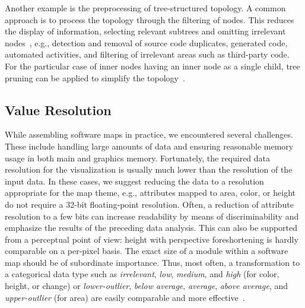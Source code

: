 \documentclass{svjour3}                     %
\begin{document}
Another example is the preprocessing of tree-structured topology.
A common approach is to process the topology through the filtering of nodes.
This reduces the display of information, selecting relevant subtrees and omitting irrelevant nodes~\citep{veras2017-minimumdescription,limberger2017-aggregation}, e.g., detection and removal of source code duplicates, generated code, automated activities, and filtering of irrelevant areas such as third-party code.
For the particular case of inner nodes having an inner node as a single child, tree pruning can be applied to simplify the topology~\citep{bladh2004-threedimensions}.

\subsection{Value Resolution}
While assembling software maps in practice, we encountered several challenges.
These include handling large amounts of data and ensuring reasonable memory usage in both main and graphics memory.
Fortunately, the required data resolution for the visualization is usually much lower than the resolution of the input data.
In these cases, we suggest reducing the data to a resolution appropriate for the map theme, e.g., attributes mapped to area, color, or height do not require a 32-bit floating-point resolution.
Often, a reduction of attribute resolution to a few bits can increase readability by means of discriminability and emphasize the results of the preceding data analysis.
This can also be supported from a perceptual point of view: height with perspective foreshortening is hardly comparable on a per-pixel basis.
The exact size of a module within a software map should be of subordinate importance.
Thus, most often, a transformation to a categorical data type such as \emph{irrelevant}, \emph{low}, \emph{medium}, and \emph{high} (for color, height, or change) or \emph{lower-outlier}, \emph{below average}, \emph{average}, \emph{above average}, and \emph{upper-outlier} (for area) are easily comparable and more effective~\citep{wettel2007-comprehension}.
\end{document}

